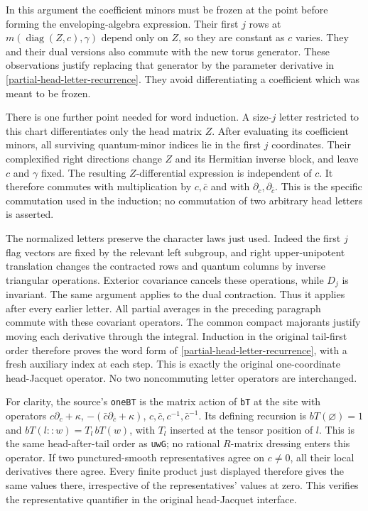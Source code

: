 In this argument the coefficient minors must be frozen at the
point before forming the enveloping-algebra expression.  Their
first $j$ rows at $m(\operatorname{diag}(Z,c),\gamma)$ depend
only on $Z$, so they are constant as $c$ varies.  They and their
dual versions also commute with the new torus generator.
These observations justify replacing that generator by the
parameter derivative in \eqref{partial-head-letter-recurrence}.
They avoid differentiating a coefficient which was meant to
be frozen.

There is one further point needed for word induction.  A size-$j$
letter restricted to this chart differentiates only the head
matrix $Z$.  After evaluating its coefficient minors, all surviving
quantum-minor indices lie in the first $j$ coordinates.  Their
complexified right directions change $Z$ and its Hermitian inverse
block, and leave $c$ and $\gamma$ fixed.  The resulting
$Z$-differential expression is independent of $c$.  It therefore
commutes with multiplication by $c,\bar c$ and with
$\partial_c,\partial_{\bar c}$.  This is the specific commutation
used in the induction; no commutation of two arbitrary head
letters is asserted.

The normalized letters preserve the character laws just used.
Indeed the first $j$ flag vectors are fixed by the relevant
left subgroup, and right upper-unipotent translation changes
the contracted rows and quantum columns by inverse triangular
operations.  Exterior covariance cancels these operations,
while $D_j$ is invariant.  The same argument applies to the
dual contraction.  Thus it applies after every earlier letter.
All partial averages in the preceding paragraph commute with
these covariant operators.  The common compact majorants justify
moving each derivative through the integral.  Induction in the
original tail-first order therefore proves the word form of
\eqref{partial-head-letter-recurrence}, with a fresh auxiliary
index at each step.  This is exactly the original one-coordinate
head-Jacquet operator.  No two noncommuting letter operators
are interchanged.

For clarity, the source's \texttt{oneBT} is the matrix action of
\texttt{bT} at the site with operators
$c\partial_c+\kappa$, $-(\bar c\partial_{\bar c}+\kappa)$,
$c,\bar c,c^{-1},\bar c^{-1}$.
Its defining recursion is $bT(\varnothing)=1$ and
$bT(l::w)=T_l\,bT(w)$, with $T_l$ inserted at the tensor position
of $l$.  This is the same head-after-tail order as
\texttt{uwG}; no rational $R$-matrix dressing enters this operator.
If two punctured-smooth representatives agree on $c\ne0$, all
their local derivatives there agree.  Every finite product just
displayed therefore gives the same values there, irrespective
of the representatives' values at zero.  This verifies the
representative quantifier in the original head-Jacquet interface.

